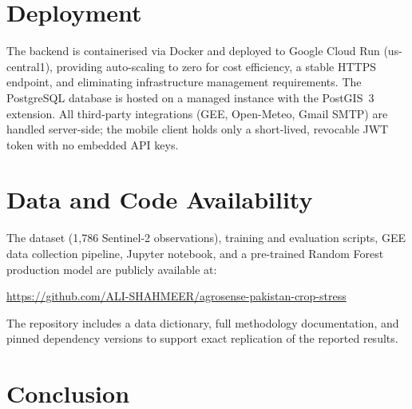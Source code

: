 \documentclass[conference]{IEEEtran}
\begin{document}
\section{Deployment}

The backend is containerised via Docker and deployed to Google Cloud Run
(us-central1), providing auto-scaling to zero for cost efficiency, a stable
HTTPS endpoint, and eliminating infrastructure management requirements. The PostgreSQL database
is hosted on a managed instance with the PostGIS~3~\cite{postgis} extension.
All third-party integrations (GEE, Open-Meteo, Gmail SMTP) are handled
server-side; the mobile client holds only a short-lived, revocable JWT token
with no embedded API keys.

\section{Data and Code Availability}

The dataset (1,786 Sentinel-2 observations), training and evaluation scripts,
GEE data collection pipeline, Jupyter notebook, and a pre-trained Random Forest
production model are publicly available at:

\begin{center}
\url{https://github.com/ALI-SHAHMEER/agrosense-pakistan-crop-stress}
\end{center}

The repository includes a data dictionary, full methodology documentation, and
pinned dependency versions to support exact replication of the reported results.

\section{Conclusion}
\end{document}
